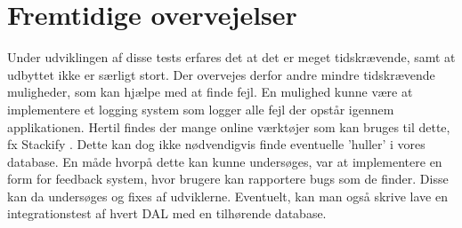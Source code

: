 \section{Fremtidige overvejelser}

Under udviklingen af disse tests erfares det at det er meget tidskrævende, samt at udbyttet ikke er særligt stort. Der overvejes derfor andre mindre tidskrævende muligheder, som kan hjælpe med at finde fejl. En mulighed kunne være at implementere et logging system som logger alle fejl der opstår igennem applikationen. Hertil findes der mange online værktøjer som kan bruges til dette, fx Stackify \cite{Stackify}. Dette kan dog ikke nødvendigvis finde eventuelle 'huller' i vores database. En måde hvorpå dette kan kunne undersøges, var at implementere en form for feedback system, hvor brugere kan rapportere bugs som de finder. Disse kan da undersøges og fixes af udviklerne. Eventuelt, kan man også skrive lave en integrationstest af hvert DAL med en tilhørende database. 